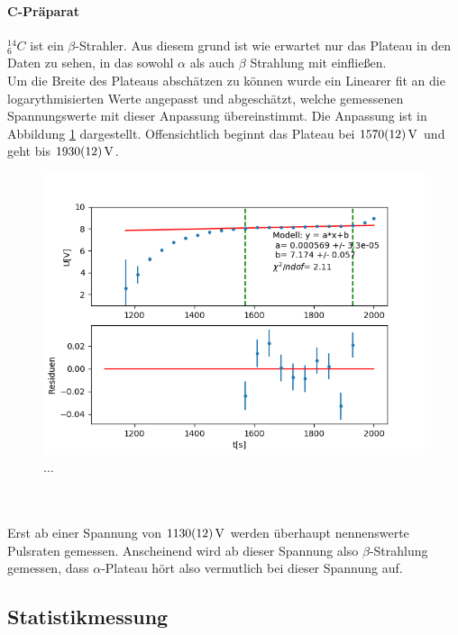 \documentclass[12pt,a4paper]{article}
\begin{document}
\paragraph{C-Präparat}
$_6^14 C$ ist ein $\beta$-Strahler. Aus diesem grund ist wie erwartet nur das Plateau in den Daten zu sehen, in das sowohl $\alpha$ als auch $\beta$ Strahlung mit einfließen.\\
Um die Breite des Plateaus abschätzen zu können wurde ein Linearer fit an die logarythmisierten Werte angepasst und abgeschätzt, welche gemessenen Spannungswerte  mit dieser Anpassung übereinstimmt. Die Anpassung ist in Abbildung \ref{fig:CPlateau} dargestellt. Offensichtlich beginnt das Plateau bei $\SI{1570\pm 12}{V}$ und geht bis $\SI{1930\pm 12}{V}$.
\begin{figure}
\centering
\includegraphics[scale=0.8]{Bilder/Prop/C_plateau.PNG}
\caption{...}
\label{fig:CPlateau}
\end{figure}\\
\\
Erst ab einer Spannung von $\SI{1130\pm 12}{V}$ werden überhaupt nennenswerte Pulsraten gemessen. Anscheinend wird ab dieser Spannung also $\beta$-Strahlung gemessen, dass $\alpha$-Plateau hört also vermutlich bei dieser Spannung auf.



\newpage


\subsection{Statistikmessung}
\end{document}
